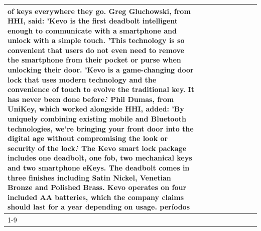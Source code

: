 \begin{table}[H]
\begin{tabular}{lllrlllll}
of keys everywhere they go. Greg Gluchowski, from HHI, said: 'Kevo is the first deadbolt intelligent enough to communicate with a smartphone and unlock with a simple touch. 'This technology is so convenient that users do not even need to remove the smartphone from their pocket or purse when unlocking their door. 'Kevo is a game-changing door lock that uses modern technology and the convenience of touch to evolve the traditional key. It has never been done before.' Phil Dumas, from UniKey, which worked alongside HHI, added: 'By uniquely combining existing mobile and Bluetooth technologies, we’re bringing your front door into the digital age without compromising the look or security of the lock.' The Kevo smart lock package includes one deadbolt, one fob, two mechanical keys and two smartphone eKeys. The deadbolt comes in three finishes including Satin Nickel, Venetian Bronze and Polished Brass. Kevo operates on four included AA batteries, which the company claims should last for a year depending on usage. períodos \\
\cline{1-9}

\end{tabular}
\end{table}
